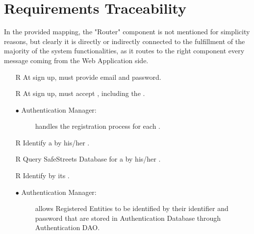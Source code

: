 \documentclass[../DD.tex]{subfiles}
\begin{document}
\chapter{Requirements Traceability}
\thispagestyle{fancy}

In the provided mapping, the "Router" component is not mentioned for simplicity reasons, but clearly it is directly or indirectly connected to the fulfillment of the majority of the system functionalities, as it routes to the right component every message coming from the Web Application side.

\begin{itemize}
	\item[R\subs{1}]At sign up,  must provide email and password.
	\item[R\subs{2}]At sign up,  must accept , including the .
	\begin{description}
	 \item[$\bullet$ Authentication Manager:] handles the registration process for each .
	\end{description}

	\item[R\subs{3}]Identify a  by his/her .
	\item[R\subs{13}]Query SafeStreets Database for a  by his/her .
	\item[R\subs{29}]Identify  by its .
	\begin{description}
	\item[$\bullet$ Authentication Manager:] allows Registered Entities to be identified by their identifier and password that are stored in Authentication Database through Authentication DAO.
	\end{description}


\end{itemize}
\end{document}

